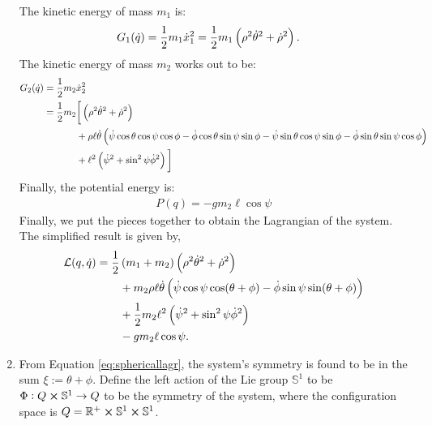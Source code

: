 \documentclass[main.tex]{subfiles}
\begin{document}
\begin{enumerate}[(1)]
The kinetic energy of mass $m_1$ is:
\begin{align}
    G_1(\qd)&=\frac{1}{2}m_1\dot{x}_1^2=\frac{1}{2}m_1
    \del{\rho^2\dot{\theta}^2+\dot{\rho}^2}
    .
\end{align}
The kinetic energy of mass $m_2$ works out to be:
\begin{align}
    G_2(\qd)&=\frac{1}{2}m_2\dot{x}_2^2\\
&\begin{aligned}
{}=\frac{1}{2}m_2&\bigg[
\del{\rho^2\dot{\theta}^2+\dot{\rho}^2}\\
&+\rho\ell\dot{\theta}
\del{
    \dot{\psi}\cos\theta\cos\psi\cos\phi-\dot{\phi}\cos\theta\sin\psi\sin\phi-\dot{\psi}\sin\theta\cos\psi\sin\phi-\dot{\phi}\sin\theta\sin\psi\cos\phi
}\\
&+\ell^2\del{
    \dot{\psi}^2+\sin^2\psi\dot{\phi
}^2
}\bigg]
\end{aligned}
\end{align}
Finally, the potential energy is:
\begin{align}
    P(q) = -gm_2\ell\cos\psi
\end{align}
Finally, we put the pieces together to obtain the Lagrangian of the system. The simplified result is given by,
\begin{align}
    \begin{aligned}
    \Lagr(q,\qd)=
    \frac{1}{2}&\del{m_1+m_2}\del{\rho^2\dot{\theta}^2+\dot{\rho}^2}\\
    & +m_2\rho\ell\dot{\theta}\del{\dot{\psi}\cos\psi\cos(\theta+\phi)-\dot{\phi}\sin\psi\sin(\theta+\phi)}\\
    &+\frac{1}{2}m_2\ell^2\del{\dot{\psi}^2+\sin^2\psi\dot{\phi}^2}\\
    &-gm_2\ell\cos\psi.
    \end{aligned}
    \label{eq:sphericallagr}
\end{align}
\item From Equation \ref{eq:sphericallagr}, the system's symmetry is found to be in the sum $\xi:=\theta+\phi$. 
Define the left action of the Lie group $\mathbb{S}^1$ to be $\Phi:Q\cross \mathbb{S}^1\to Q$ to be the symmetry of the system, where the configuration space is $Q=\mathbb{R}^+\cross \mathbb{S}^1\cross \mathbb{S}^1$.

\end{enumerate}
\end{document}
